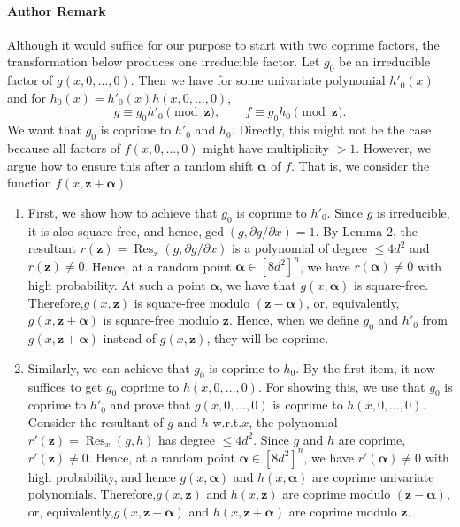 \documentclass[10pt,a4paper]{article}
\newcommand{\Res}{\operatorname{Res}}
\begin{document}
\paragraph{Author Remark}
Although it would suffice for our purpose to start with two coprime factors, the transformation below produces one irreducible factor.
Let $g_0$ be an irreducible factor of $g(x,0,\ldots,0)$. Then we have for some univariate polynomial $h'_0(x)$ and for $h_0(x)=h'_0(x)h(x,0,\ldots,0)$,
\[g\equiv g_0h'_0\pmod{\mathbf z},\qquad f\equiv g_0h_0\pmod{\mathbf z}.\]
We want that $g_0$ is coprime to $h'_0$ and $h_0$. Directly, this might not be the case because all factors of $f(x,0,\ldots,0)$ might have multiplicity $>1$. However, we argue how to ensure this after a random shift $\boldsymbol\alpha$ of $f$. That is, we consider the function $f(x,\mathbf z+\boldsymbol\alpha)$
\begin{enumerate}
\item First, we show how to achieve that $g_0$ is coprime to $h'_0$.
Since $g$ is irreducible, it is also square-free, and hence,$\gcd(g,\partial g/\partial x)=1$. By Lemma 2, the resultant $r(\mathbf z)=\Res_x(g,\partial g/\partial x)$ is a polynomial of degree $\leq4d^2$ and $r(\mathbf z)\ne0$. Hence, at a random point $\boldsymbol\alpha\in[8d^2]^n$, we have $r(\boldsymbol\alpha)\ne0$ with high probability. At such a point $\boldsymbol\alpha$, we have that $g(x,\boldsymbol\alpha)$ is square-free. Therefore,$g(x,\mathbf z)$ is square-free modulo $(\mathbf z-\boldsymbol\alpha)$, or, equivalently,$g(x,\mathbf z+\boldsymbol\alpha)$ is square-free modulo $\mathbf z$. Hence, when we define $g_0$ and $h'_0$ from $g(x,\mathbf z+\boldsymbol\alpha)$ instead of $g(x,\mathbf z)$, they will be coprime.
\item Similarly, we can achieve that $g_0$ is coprime to $h_0$. By the first item, it now suffices to get $g_0$ coprime to $h(x,0,\ldots,0)$.
For showing this, we use that $g_0$ is coprime to $h'_0$ and prove that $g(x,0,\ldots,0)$ is coprime to $h(x,0,\ldots,0)$. Consider the resultant of $g$ and $h$ w.r.t.$x$, the polynomial $r'(\mathbf z)=\Res_x(g,h)$ has degree $\leq4d^2$. Since $g$ and $h$ are coprime,$r'(\mathbf z)\ne0$. Hence, at a random point $\boldsymbol\alpha\in[8d^2]^n$, we have $r'(\boldsymbol\alpha)\ne0$ with high probability, and hence $g(x,\boldsymbol\alpha)$ and $h(x,\boldsymbol\alpha)$ are coprime univariate polynomials. Therefore,$g(x,\mathbf z)$ and $h(x,\mathbf z)$ are coprime modulo $(\mathbf z-\boldsymbol\alpha)$, or, equivalently,$g(x,\mathbf z+\boldsymbol\alpha)$ and $h(x,\mathbf z+\boldsymbol\alpha)$ are coprime modulo $\mathbf z$.
\end{enumerate}
\end{document}
